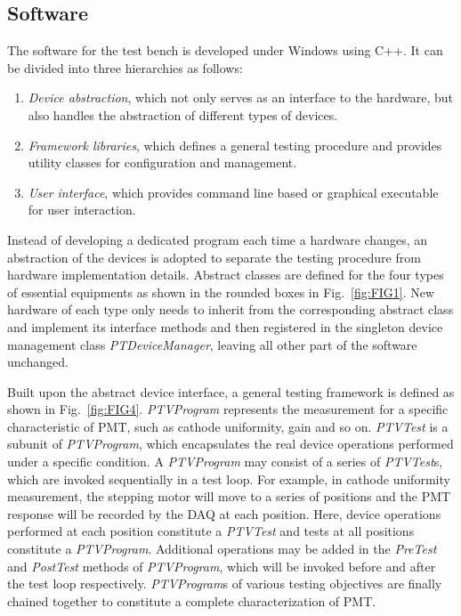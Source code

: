 \documentclass[a4paper,10pt,twoside]{cpc-hepnp}
\begin{document}
\begin{multicols}{2}
\subsection{Software}
\label{sec:software}

The software for the test bench is developed under Windows using C++. It can be divided into three hierarchies as follows:
\begin{enumerate}
	\item \textit{Device abstraction}, which not only serves as an interface to the hardware, but also handles the abstraction of different types of devices. 
	\item \textit{Framework libraries}, which defines a general testing procedure and provides utility classes for configuration and management.
	\item \textit{User interface}, which provides command line based or graphical executable for user interaction. 
\end{enumerate}

Instead of developing a dedicated program each time a hardware changes, an abstraction of the devices is adopted to separate the testing procedure from hardware implementation details. 
Abstract classes are defined for the four types of essential equipments as shown in the rounded boxes in Fig.~\ref{fig:FIG1}.
New hardware of each type only needs to inherit from the corresponding abstract class and implement its interface methods and then registered in the singleton device management class \textit{PTDeviceManager}, leaving all other part of the software unchanged.
	
Built upon the abstract device interface, a general testing framework is defined as shown in Fig.~\ref{fig:FIG4}.
\textit{PTVProgram} represents the measurement for a specific characteristic of PMT, such as cathode uniformity, gain and so on.
\textit{PTVTest} is a subunit of \textit{PTVProgram}, which encapsulates the real device operations performed under a specific condition.
A \textit{PTVProgram} may consist of a series of \textit{PTVTest}s, which are invoked sequentially in a test loop.
For example, in cathode uniformity measurement, the stepping motor will move to a series of positions and the PMT response will be recorded by the DAQ at each position.
Here, device operations performed at each position constitute a \textit{PTVTest} and tests at all positions constitute a \textit{PTVProgram}.
Additional operations may be added in the \textit{PreTest} and \textit{PostTest} methods of \textit{PTVProgram}, which will be invoked before and after the test loop respectively.
\textit{PTVProgram}s of various testing objectives are finally chained together to constitute a complete characterization of PMT.

\end{multicols}
\end{document}
